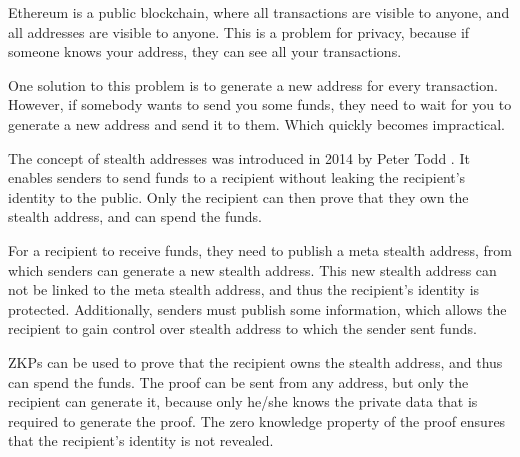 Ethereum is a public blockchain, where all transactions are visible to anyone,
and all addresses are visible to anyone. This is a problem for privacy, because
if someone knows your address, they can see all your transactions.

One solution to this problem is to generate a new address for every transaction.
However, if somebody wants to send you some funds, they need to wait for you to
generate a new address and send it to them. Which quickly becomes impractical.

The concept of stealth addresses was introduced in 2014 by Peter Todd \cite{ToddStealthAddresses}.
It enables senders to send funds to a recipient without leaking the recipient's
identity to the public. Only the recipient can then prove that they own the stealth
address, and can spend the funds.

For a recipient to receive funds, they need to publish a meta stealth address,
from which senders can generate a new stealth address. This new stealth address
can not be linked to the meta stealth address, and thus the recipient's identity
is protected. Additionally, senders must publish some information, which allows
the recipient to gain control over stealth address to which the sender
sent funds.

ZKPs can be used to prove that the recipient owns the stealth address, and
thus can spend the funds. The proof can be sent from any address, but only
the recipient can generate it, because only he/she knows the private data
that is required to generate the proof. The zero knowledge property of the
proof ensures that the recipient's identity is not revealed.


